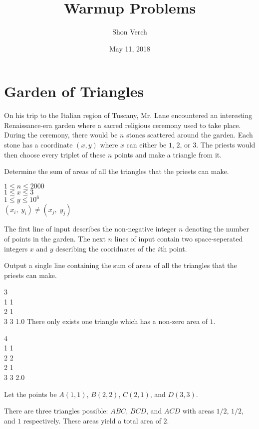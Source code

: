 \documentclass{problem-set}
\title{Warmup Problems}
\date{May 11, 2018}
\author{Shon Verch}
\begin{document}
\maketitle

\section{Garden of Triangles}
On his trip to the Italian region of Tuscany, Mr. Lane encountered an interesting Renaissance-era garden where a sacred religious ceremony used to take place. During the ceremony, there would be $n$ stones scattered around the garden. Each stone has a coordinate $(x,y)$ where $x$ can either be $1$, $2$, or $3$. The priests would then choose every triplet of these $n$ points and make a triangle from it. 

Determine the sum of areas of all the triangles that the priests can make.\\

 
\constraints
$1 \leq n \leq 2000$\\
$1 \leq x \leq 3$\\
$1 \leq y \leq 10^6$\\
$(x_i,\;y_i) \neq (x_j,\;y_j)$

The first line of input describes the non-negative integer $n$ denoting the number of points in the garden. The next $n$ lines of input contain two space-seperated integers $x$ and $y$ describing the cooridnates of the $i$th point.

\outputformat
Output a single line containing the sum of areas of all the triangles that the priests can make.

\pushnewpage

\addsampleExplanation
{
3\\
1 1\\
2 1\\
3 3
}
{
1.0
}
{
There only exists one triangle which has a non-zero area of $1$.
}

\addsampleExplanation
{
4\\
1 1\\
2 2\\
2 1\\
3 3
}
{
2.0
}
{
Let the points be $A(1,1)$, $B(2,2)$, $C(2,1)$, and $D(3,3)$. 

There are three triangles possible: $ABC$, $BCD$, and $ACD$ with areas $1/2$, $1/2$, and $1$ respectively. These areas yield a total area of $2$.
}
\end{document}
